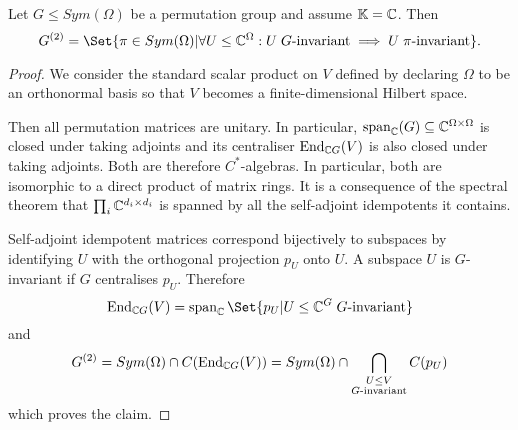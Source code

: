 \documentclass[fontsize=11pt,fleqn,a4paper]{scrartcl}
\begin{document}
\begin{theorem}\label{two_closure:in_terms_of_subspaces}
Let $G\leq Sym(\Omega)$ be a permutation group and assume $\mathbb{K}=\mathbb{C}$. Then
\[G^{(2)} = \Set{\pi\in Sym(\Omega) | \forall U\leq\IC^\Omega: U\;G\text{-invariant} \implies U\;\pi\text{-invariant}}.\]
\end{theorem}
\begin{proof}
We consider the standard scalar product on $V$ defined by declaring $\Omega$ to be an orthonormal basis so that $V$ becomes a finite-dimensional Hilbert space.

Then all permutation matrices are unitary. In particular, $\operatorname{span}_{\mathbb{C}}(G)\subseteq\mathbb{C}^{\Omega\times\Omega}$ is closed under taking adjoints and its centraliser $\operatorname{End}_{\mathbb{C} G}(V)$ is also closed under taking adjoints. Both are therefore $C^\ast$-algebras. In particular, both are isomorphic to a direct product of matrix rings. It is a consequence of the spectral theorem that $\prod_i \mathbb{C}^{d_i\times d_i}$ is spanned by all the self-adjoint idempotents it contains.

\medbreak
Self-adjoint idempotent matrices correspond bijectively to subspaces by identifying $U$ with the orthogonal projection $p_U$ onto $U$. A subspace $U$ is $G$-invariant if $G$ centralises $p_U$. Therefore
\[\End_{\IC G}(V) = \LinHull_\IC\Set{p_U | U\leq\IC^G\;G\text{-invariant}}\]
and
\[G^{(2)} = Sym(\Omega) \cap C(\operatorname{End}_{\mathbb{C} G}(V)) = Sym(\Omega) \cap \bigcap_{\substack{U\leq V \\ G\text{-invariant}}} C(p_U)\]
which proves the claim.
\end{proof}
\end{document}
